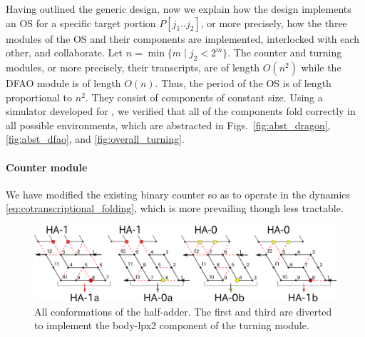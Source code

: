 Having outlined the generic design, now we explain how the design implements an OS for a specific target portion $P[j_1 .. j_2]$, or more precisely, how the three modules of the OS and their components are implemented, interlocked with each other, and collaborate. 
Let $n = \min\{m \mid j_2 < 2^m\}$. 
The counter and turning modules, or more precisely, their transcripts, are of length $O(n^2)$ while the DFAO module is of length $O(n)$. 
Thus, the period of the OS is of length proportional to $n^2$. 
They consist of components of constant size. 
Using a simulator developed for \cite{HaKiOtSe2016}, we verified that all of the components fold correctly in all possible environments, which are abstracted in Figs.~\ref{fig:abst_dragon}, \ref{fig:abst_dfao}, and \ref{fig:overall_turning}. 

			\paragraph{Counter module}
%
We have modified the existing binary counter \cite{GeMeScSe2016} so as to operate in the dynamics \eqref{eq:cotranscriptional_folding}, which is more prevailing \cite{HanKim2017,HaKiOtSe2016,OtaSeki2017} though less tractable. 

\begin{figure}
\vspace*{-5mm}
\centering
\includegraphics[width=\linewidth]{pic/counter_zig.png}
\caption{All conformations of the half-adder.
The first and third are diverted to implement the body-lpx2 component of the turning module. 
}
\label{fig:half-adder}
\vspace*{-5mm}
\end{figure}

